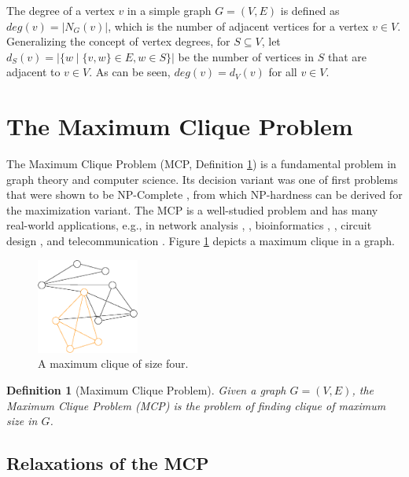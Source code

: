 \documentclass[draft,final]{vutinfth} %
\newtheorem{definition}{Definition}[section]
\begin{document}
The degree of a vertex $v$ in a simple graph $G = (V,E)$ is defined as $\mathit{deg}(v) = |N_G(v)|$, which is the number of adjacent vertices for a vertex $v \in V$. Generalizing the concept of vertex degrees, for $S \subseteq V$, let $d_S(v) = |\{w \mid \{v,w\} \in E, w \in S\}|$ be the number of vertices in $S$ that are adjacent to $v \in V$. As can be seen, $\mathit{deg}(v) = d_V(v) $ for all $v \in V$. 


\section{The Maximum Clique Problem}\label{sec:mcp}

The Maximum Clique Problem (MCP, Definition \ref{def:mcp}) is a fundamental problem in graph theory and computer science. Its decision variant was one of first problems that were shown to be NP-Complete \cite{Karp1972}, from which NP-hardness can be derived for the maximization variant. The MCP is a well-studied problem and has many real-world applications, e.g., in network analysis \cite{Fortunato09}, \cite{Palla2005}, bioinformatics \cite{Depolli2013}, \cite{BUTENKO20061}, circuit design \cite{LeckyMA89}, and telecommunication \cite{DouikSAA14}. 
Figure \ref{fig:maxclique} depicts a maximum clique in a graph. 
\begin{figure}
    \centering
    \includegraphics[width=0.3\textwidth]{graphics/graph1-clique.eps}
    \caption{A maximum clique of size four.}
    \label{fig:maxclique}
\end{figure}

\begin{definition}[Maximum Clique Problem]
	\label{def:mcp}
	Given a graph $G = (V,E)$, the Maximum Clique Problem (MCP) is the problem of finding clique of maximum size in $G$. 
\end{definition}

\subsection{Relaxations of the MCP}
\end{document}
